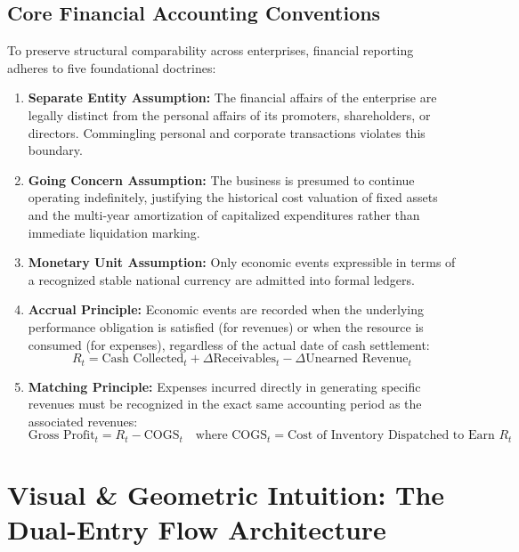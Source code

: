 \subsection{Core Financial Accounting Conventions}
To preserve structural comparability across enterprises, financial reporting adheres to five foundational doctrines:
\begin{enumerate}
    \item \textbf{Separate Entity Assumption:} The financial affairs of the enterprise are legally distinct from the personal affairs of its promoters, shareholders, or directors. Commingling personal and corporate transactions violates this boundary.
    \item \textbf{Going Concern Assumption:} The business is presumed to continue operating indefinitely, justifying the historical cost valuation of fixed assets and the multi-year amortization of capitalized expenditures rather than immediate liquidation marking.
    \item \textbf{Monetary Unit Assumption:} Only economic events expressible in terms of a recognized stable national currency are admitted into formal ledgers.
    \item \textbf{Accrual Principle:} Economic events are recorded when the underlying performance obligation is satisfied (for revenues) or when the resource is consumed (for expenses), regardless of the actual date of cash settlement:
    \begin{equation}
    R_t = \text{Cash Collected}_t + \Delta \text{Receivables}_t - \Delta \text{Unearned Revenue}_t
    \end{equation}
    \item \textbf{Matching Principle:} Expenses incurred directly in generating specific revenues must be recognized in the exact same accounting period as the associated revenues:
    \begin{equation}
    \text{Gross Profit}_t = R_t - \text{COGS}_t \quad \text{where } \text{COGS}_t = \text{Cost of Inventory Dispatched to Earn } R_t
    \end{equation}
\end{enumerate}

\section{Visual \& Geometric Intuition: The Dual-Entry Flow Architecture}

